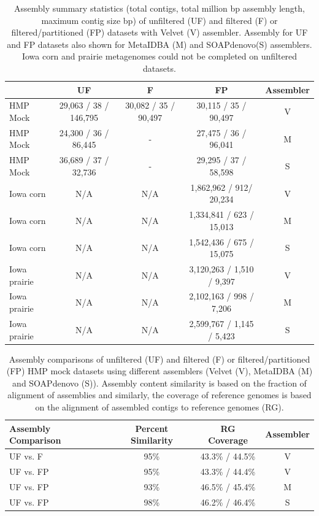 \documentclass[11pt]{article} %
\begin{document}
\begin{table}[ht]
\caption{Assembly summary statistics (total contigs, total million bp assembly length, maximum contig size bp) of unfiltered (UF) and filtered (F) or filtered/partitioned (FP) datasets with Velvet (V) assembler.  Assembly for UF and FP datasets also shown for MetaIDBA (M) and SOAPdenovo(S) assemblers.  Iowa corn and prairie metagenomes could not be completed on unfiltered datasets.}
\begin{tabular}{l c c c c}
& UF & F & FP & Assembler \\
\hline
HMP Mock & 29,063 / 38 / 146,795 & 30,082 / 35 / 90,497 & 30,115 / 35 / 90,497 & V \\
HMP Mock & 24,300 / 36  / 86,445 & - & 27,475 / 36 / 96,041 & M \\
HMP Mock & 36,689 / 37 / 32,736 & - & 29,295 / 37 / 58,598 & S \\
Iowa corn & N/A & N/A & 1,862,962 / 912/ 20,234 & V \\
Iowa corn & N/A & N/A & 1,334,841 / 623 / 15,013 & M \\
Iowa corn & N/A & N/A & 1,542,436 / 675 / 15,075 & S \\
Iowa prairie & N/A & N/A & 3,120,263 / 1,510 / 9,397 & V \\
Iowa prairie & N/A & N/A & 2,102,163 / 998 / 7,206 & M \\
Iowa prairie & N/A & N/A & 2,599,767 / 1,145 / 5,423 & S \\
\end{tabular}
\label{assembly-summary}
\end{table}

\begin{table}[ht]
\caption{Assembly comparisons of unfiltered (UF) and filtered (F) or filtered/partitioned (FP) HMP mock datasets using different assemblers (Velvet (V), MetaIDBA (M) and SOAPdenovo (S)).  Assembly content similarity is based on the fraction of alignment of assemblies and similarly, the coverage of reference genomes is based on the alignment of assembled contigs to reference genomes (RG).}
\begin{tabular}{l c c c}
Assembly Comparison & Percent Similarity & RG Coverage & Assembler \\
\hline
UF vs. F & 95\% & 43.3\% / 44.5\% & V \\
UF vs. FP & 95\% & 43.3\% / 44.4\% & V\\
UF vs. FP & 93\% & 46.5\% / 45.4\% & M\\ 
UF vs. FP & 98\% &  46.2\% / 46.4\% & S\\
\end{tabular}
\label{assembly-compare}
\end{table}
\end{document}
